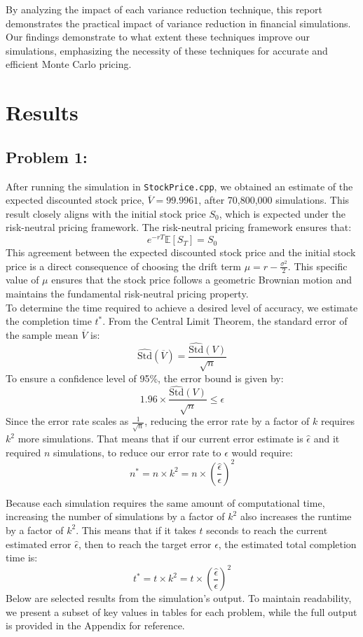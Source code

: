\documentclass{report}
\begin{document}
By analyzing the impact of each variance reduction technique, this report demonstrates the practical impact of variance reduction in financial simulations. Our findings demonstrate to what extent these techniques improve our simulations, emphasizing the necessity of these techniques for accurate and efficient Monte Carlo pricing.

\newpage

\section*{Results}
\subsection*{Problem 1:}
After running the simulation in \texttt{StockPrice.cpp}, we obtained an estimate of the expected discounted stock price, $\overline{V} = 99.9961$, after 70,800,000 simulations. This result closely aligns with the initial stock price $S_0$, which is expected under the risk-neutral pricing framework. The risk-neutral pricing framework ensures that:
\[
e^{-rT} \mathbb{E}[S_T]=S_0
\]
This agreement between the expected discounted stock price and the initial stock price is a direct consequence of choosing the drift term $\mu = r - \frac{\sigma^2}{2}$. This specific value of $\mu$ ensures that the stock price follows a geometric Brownian motion and maintains the fundamental risk-neutral pricing property. \\

To determine the time required to achieve a desired level of accuracy, we estimate the completion time $t^*$. From the Central Limit Theorem, the standard error of the sample mean $\overline{V}$ is:
\[
\hat{\text{Std}}(\overline{V})=\frac{\hat{\text{Std}}(V)}{\sqrt{n}}
\]
To ensure a confidence level of 95\%, the error bound is given by:
\[
1.96 \times \frac{\hat{\text{Std}}(V)}{\sqrt{n}} \leq \epsilon
\]
Since the error rate scales as $\frac{1}{\sqrt{n}}$, reducing the error rate by a factor of $k$ requires $k^2$ more simulations. That means that if our current error estimate is $\hat{\epsilon}$ and it required $n$ simulations, to reduce our error rate to $\epsilon$ would require:
\[
n^* = n \times k^2 = n\times \left(\frac{\hat{\epsilon}}{\epsilon}\right)^2
\]

Because each simulation requires the same amount of computational time, increasing the number of simulations by a factor of $k^2$ also increases the runtime by a factor of $k^2$. This means that if it takes $t$ seconds to reach the current estimated error $\hat{\epsilon}$, then to reach the target error $\epsilon$, the estimated total completion time is:
\[
t^* = t \times k^2 = t\times \left(\frac{\hat{\epsilon}}{\epsilon}\right)^2
\]
\newpage
Below are selected results from the simulation's output. To maintain readability, we present a subset of key values in tables for each problem, while the full output is provided in the Appendix for reference.
\end{document}
